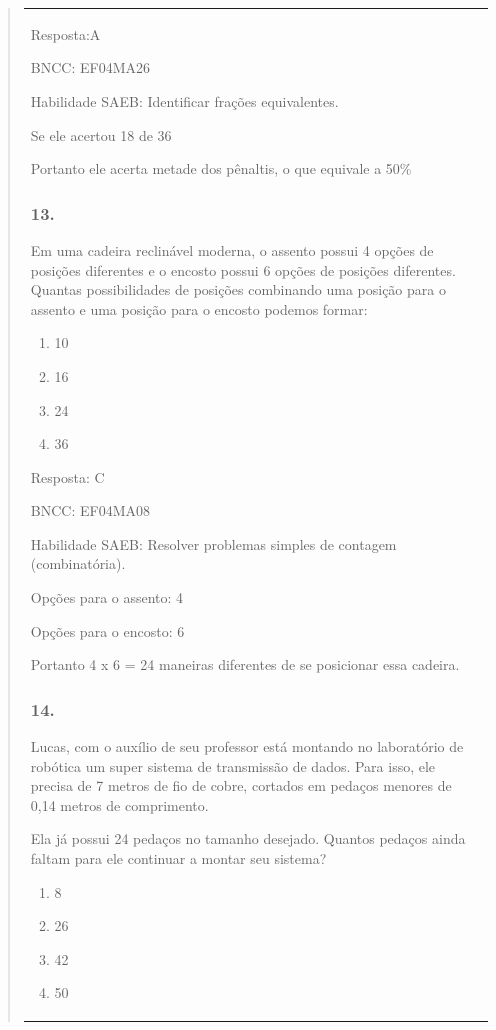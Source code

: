 \begin{enumerate}
\begin{escolha}
\begin{enumerate}
\begin{itemize}
\begin{itemize}
\begin{escolha}
\begin{quote}
\begin{escolha}
{\begin{longtable}[]{@{}l@{}}
\begin{itemize}
Resposta:A

BNCC: EF04MA26

Habilidade SAEB: Identificar frações equivalentes.

Se ele acertou 18 de 36

Portanto ele acerta metade dos pênaltis, o que equivale a 50\%

\subsubsection{13.}\label{section-184}

Em uma cadeira reclinável moderna, o assento possui 4 opções de posições
diferentes e o encosto possui 6 opções de posições diferentes. Quantas
possibilidades de posições combinando uma posição para o assento e uma
posição para o encosto podemos formar:

\begin{enumerate}
\def\labelenumi{\alph{enumi})}
\item
  10
\item
  16
\item
  24
\item
  36
\end{enumerate}

Resposta: C

BNCC: EF04MA08

Habilidade SAEB: Resolver problemas simples de contagem (combinatória).

Opções para o assento: 4

Opções para o encosto: 6

Portanto 4 x 6 = 24 maneiras diferentes de se posicionar essa cadeira.

\subsubsection{14.}\label{section-185}

Lucas, com o auxílio de seu professor está montando no laboratório de
robótica um super sistema de transmissão de dados. Para isso, ele
precisa de 7 metros de fio de cobre, cortados em pedaços menores de 0,14
metros de comprimento.

Ela já possui 24 pedaços no tamanho desejado. Quantos pedaços ainda
faltam para ele continuar a montar seu sistema?

\begin{enumerate}
\def\labelenumi{\alph{enumi})}
\item
  8
\item
  26
\item
  42
\item
  50
\end{enumerate}


\end{itemize}
\end{longtable}}
\end{escolha}
\end{quote}
\end{escolha}
\end{itemize}
\end{itemize}
\end{enumerate}
\end{escolha}
\end{enumerate}
